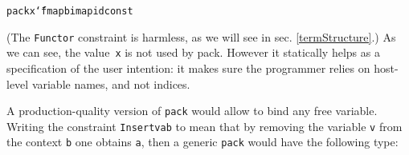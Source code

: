 \documentclass[9pt,preprint,authoryear]{sigplanconf}
\begin{document}
{{{}\vphantom{$\{$}}}\textcolor[rgb]{0,0,0.80}{\texttt{pack}}\textcolor[rgb]{0,0,0.80}{\texttt{\mbox{\hspace{0.50em}}}}\textcolor[rgb]{0,0,0.80}{\texttt{x}}\textcolor[rgb]{0,0,0.80}{\texttt{\mbox{\hspace{0.50em}}}}\textcolor[cmyk]{0,0.65,0.99,0}{\texttt{{\char `\=}}}\textcolor[rgb]{0,0,0.80}{\texttt{\mbox{\hspace{0.50em}}}}\textcolor[rgb]{0,0,0.80}{\texttt{fmap}}\textcolor[rgb]{0,0,0.80}{\texttt{\mbox{\hspace{0.50em}}}}\textcolor[cmyk]{0,0.65,0.99,0}{\texttt{\makebox[1.22ex][l]{$ {(} $}}}\textcolor[rgb]{0,0,0.80}{\texttt{bimap}}\textcolor[rgb]{0,0,0.80}{\texttt{\mbox{\hspace{0.50em}}}}\textcolor[rgb]{0,0,0.80}{\texttt{id}}\textcolor[rgb]{0,0,0.80}{\texttt{\mbox{\hspace{0.50em}}}}\textcolor[cmyk]{0,0.65,0.99,0}{\texttt{\makebox[1.22ex][l]{$ {(} $}}}\textcolor[rgb]{0,0,0.80}{\texttt{const}}\textcolor[rgb]{0,0,0.80}{\texttt{\mbox{\hspace{0.50em}}}}\textcolor[cmyk]{0,0.65,0.99,0}{\texttt{\makebox[1.22ex][l]{$ {(} $}}}\textcolor[cmyk]{0,0.65,0.99,0}{\texttt{\makebox[1.22ex][r]{$ {)} $}}}\textcolor[cmyk]{0,0.65,0.99,0}{\texttt{\makebox[1.22ex][r]{$ {)} $}}}\textcolor[cmyk]{0,0.65,0.99,0}{\texttt{\makebox[1.22ex][r]{$ {)} $}}}\textcolor[rgb]{0,0,0.80}{\texttt{{\nopagebreak \newline%
}\vphantom{$\{$}}}%


%
(The \textcolor[rgb]{0,0,0.80}{\texttt{Functor}} constraint is harmless, as we will see in sec. \ref{termStructure}.)
    As we can see, the value{~}\textcolor[rgb]{0,0,0.80}{\texttt{x}} is not used by pack. However it
    statically helps as a specification of the user intention{:} it makes sure
    the programmer relies on host-level variable names, and not indices.%


%
A production-quality version of \textcolor[rgb]{0,0,0.80}{\texttt{pack}} would allow to bind any 
    free variable. Writing the constraint \textcolor[rgb]{0,0,0.80}{\texttt{Insert}}\textcolor[rgb]{0,0,0.80}{\texttt{\mbox{\hspace{0.50em}}}}\textcolor[rgb]{0,0,0.80}{\texttt{v}}\textcolor[rgb]{0,0,0.80}{\texttt{\mbox{\hspace{0.50em}}}}\textcolor[rgb]{0,0,0.80}{\texttt{a}}\textcolor[rgb]{0,0,0.80}{\texttt{\mbox{\hspace{0.50em}}}}\textcolor[rgb]{0,0,0.80}{\texttt{b}} to mean 
    that by removing the variable \textcolor[rgb]{0,0,0.80}{\texttt{v}} 
    from the context \textcolor[rgb]{0,0,0.80}{\texttt{b}} one obtains \textcolor[rgb]{0,0,0.80}{\texttt{a}}, then a generic \textcolor[rgb]{0,0,0.80}{\texttt{pack}} would have the 
    following type{:}%
\end{document}
